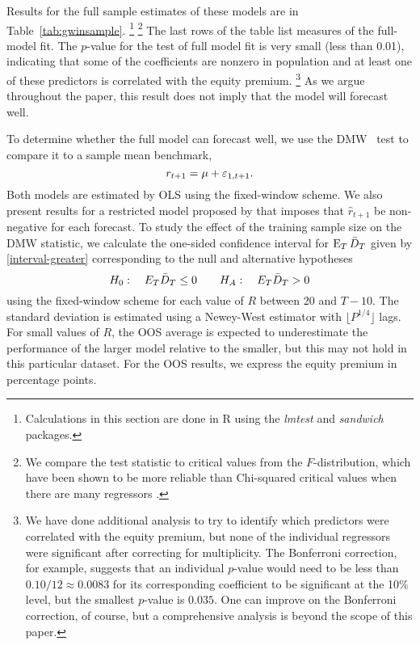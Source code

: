 \documentclass[12pt]{article}
\begin{document}
Results for the full sample estimates of these models are in
Table~\ref{tab:gwinsample}.%
\footnote{Calculations in this section are done in R \citep{Rde:10}
  using the \emph{lmtest} \citep{ZeH:02} and \emph{sandwich}
  \citep{Zei:04} packages.}%
\footnote{We compare the test statistic to critical values from the
  $F$-distribution, which have been shown to be more reliable than
  Chi-squared critical values when there are many regressors
  \citep{Ana:12,Cal:11c}.} %
The last rows of the table list measures of the full-model fit.  The
$p$-value for the test of full model fit is very small (less than
0.01), indicating that some of the coefficients are nonzero in
population and at least one of these predictors is correlated with the
equity premium.%
\footnote{We have done additional analysis to try to identify which
  predictors were correlated with the equity premium, but none of the
  individual regressors were significant after correcting for
  multiplicity. The Bonferroni correction, for example, suggests that
  an individual $p$-value would need to be less than $0.10/12 \approx
  0.0083$ for its corresponding coefficient to be significant at the
  10\% level, but the smallest $p$-value is $0.035$. One can improve
  on the Bonferroni correction, of course, but a comprehensive
  analysis is beyond the scope of this paper.} %
As we argue throughout the paper, this result does not imply that the
model will forecast well.

To determine whether the full model can forecast well, we use the DMW
\oost\ test to compare it to a sample mean benchmark,
\begin{equation*}
r_{t+1} = \mu + \varepsilon_{1,t+1}.
\end{equation*}
Both models are estimated by OLS using the fixed-window scheme. We
also present results for a restricted model proposed by
\citet{CaT:08} that imposes that $\hat r_{t+1}$ be non-negative for
each forecast.
To study the effect of the training sample size on the DMW statistic, we
calculate the one-sided confidence interval for $\operatorname{E}_T \bar{D}_{T}$ given
by \eqref{interval-greater} corresponding to the null and alternative
hypotheses
\[ H_0: \quad E_T \bar{D}_{T} \leq 0 \qquad
H_A: \quad E_T \bar{D}_{T} > 0
\]
using the fixed-window scheme for each value of $R$ between 20 and
$T-10$. The standard deviation is estimated using a Newey-West
estimator with $\lfloor P^{1/4}\rfloor$ lags.  For small values of
$R$, the OOS average is expected to underestimate the performance of
the larger model relative to the smaller, but this may not hold in
this particular dataset. For the OOS results, we express the equity
premium in percentage points.
\end{document}

